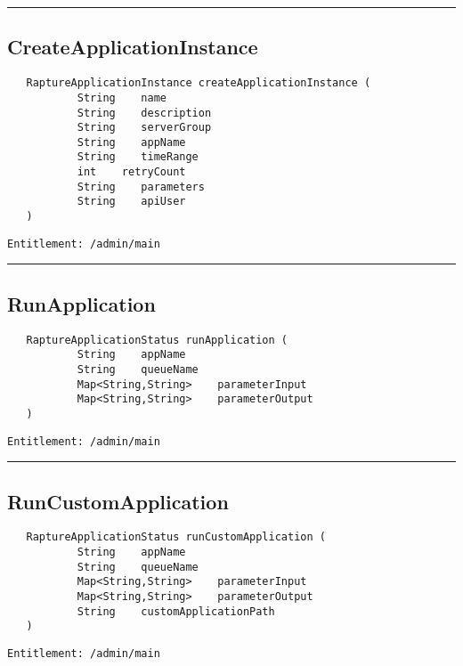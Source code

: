 \rule{12cm}{2pt}
\subsection{CreateApplicationInstance}
\label{Api:CreateApplicationInstance}
\begin{Verbatim}
   RaptureApplicationInstance createApplicationInstance (
           String    name
           String    description
           String    serverGroup
           String    appName
           String    timeRange
           int    retryCount
           String    parameters
           String    apiUser
   )
\end{Verbatim}
\begin{Verbatim}[formatcom=\color{Maroon}]
  Entitlement: /admin/main
\end{Verbatim}



\rule{12cm}{2pt}
\subsection{RunApplication}
\label{Api:RunApplication}
\begin{Verbatim}
   RaptureApplicationStatus runApplication (
           String    appName
           String    queueName
           Map<String,String>    parameterInput
           Map<String,String>    parameterOutput
   )
\end{Verbatim}
\begin{Verbatim}[formatcom=\color{Maroon}]
  Entitlement: /admin/main
\end{Verbatim}



\rule{12cm}{2pt}
\subsection{RunCustomApplication}
\label{Api:RunCustomApplication}
\begin{Verbatim}
   RaptureApplicationStatus runCustomApplication (
           String    appName
           String    queueName
           Map<String,String>    parameterInput
           Map<String,String>    parameterOutput
           String    customApplicationPath
   )
\end{Verbatim}
\begin{Verbatim}[formatcom=\color{Maroon}]
  Entitlement: /admin/main
\end{Verbatim}



